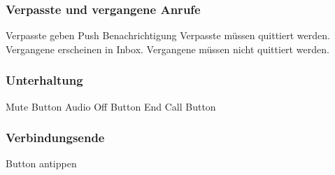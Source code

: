 \subsubsection{Verpasste und vergangene Anrufe}

Verpasste geben Push Benachrichtigung
Verpasste müssen quittiert werden.
Vergangene erscheinen in Inbox.
Vergangene müssen nicht quittiert werden.

\subsubsection{Unterhaltung}

Mute Button
Audio Off Button
End Call Button


\subsubsection{Verbindungsende}

Button antippen

\clearpage
